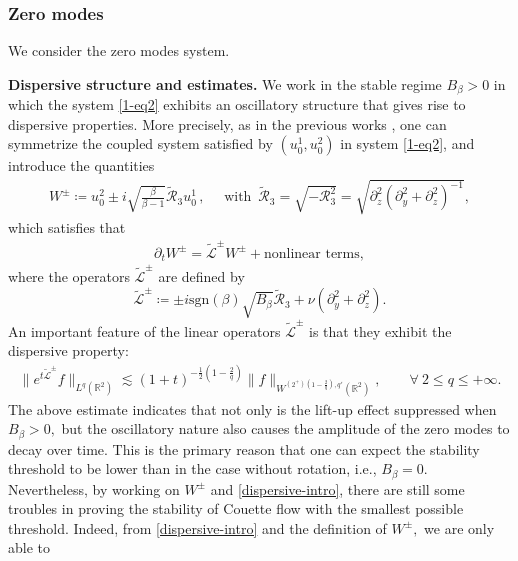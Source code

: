 \documentclass[11pt,reqno]{article}
\numberwithin{equation}{section}
\newcommand\R{{\mathbb R}}
\newcommand \tri {\coloneqq}
\let\pa=\partial
\let\f=\frac
\def \pt {\partial_t}
\begin{document}
\subsubsection{Zero modes}
We consider the zero modes system.
\medskip


\noindent\textbf{Dispersive structure and estimates.}
We work in the stable regime 
$B_{\beta}>0$ in which the system \eqref{1-eq2} exhibits an oscillatory structure that gives rise to dispersive properties.
More precisely, as in the previous works \cite{Huang-Sun-Xu, Huang-Sun-Xu-1, Coti-Zotto-Widmayer-2025}, one can
 symmetrize the coupled system satisfied by 
$(u_0^1,u_0^2)$ in system \eqref{1-eq2}, 
and introduce the quantities 
\begin{align*} 
	W^{\pm}\tri u_0^2\pm i \sqrt{\f{\beta}{\beta-1}} \tilde{\mathcal{R}}_3 u_0^1\,, \quad \text{ with } \,
	 \tilde{\mathcal{R}}_3=\sqrt{-\mathcal{R}^2_3}= %
     \sqrt{\pa_z^2(\pa_y^2+\pa_z^2)^{-1}},
\end{align*}
which satisfies that
\begin{align*}
	\pt W^{\pm}=  	\tilde{\mathcal{L}}^{\pm}W^{\pm}+\textrm{nonlinear terms},
\end{align*}
where the operators $\tilde{\mathcal{L}}^{\pm}$ are defined by
$$\tilde{\mathcal{L}}^{\pm}\tri \pm i\mathrm{sgn}(\beta)\sqrt{B_{\beta}}\tilde{\mathcal{R}}_3 +\nu(\pa_y^2+\pa_z^2). 
$$
An important feature of the linear operators $\tilde{\mathcal{L}}^{\pm}$ is that they exhibit the dispersive property: 
\begin{align}\label{dispersive-intro}
	\|e^{t\tilde{\mathcal{L}}^{\pm}}f\|_{L^{q}(\R^2)}\lesssim (1+t)^{-\f12(1-\f2{q})} \|f\|_{W^{(2^{+})(1-\f2q),q'}(\R^2)}, \qquad \forall~ 2\leq q\leq +\infty.
\end{align}
The above estimate indicates that not only is the lift-up effect suppressed when
$B_{\beta}> 0,$ but the oscillatory nature also causes the amplitude of the zero modes to decay over time. This is the primary reason that one can expect the stability threshold to be lower than in the case without rotation, i.e., $B_{\beta}=0$.
Nevertheless, by working on $W^{\pm}$ and \eqref{dispersive-intro}, there are still
 some troubles in proving the stability of Couette flow with the smallest possible threshold. Indeed, from \eqref{dispersive-intro} and the definition of $W^{\pm},$ we are only able to 
\end{document}
